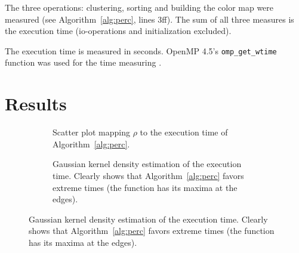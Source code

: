\documentclass[twoside,11pt]{article}
\begin{document}
The three operations: clustering, sorting and building the
color map were measured (see Algorithm~\ref{alg:perc},
lines 3ff).
The sum of all three measures is the execution time
(io-operations and initialization excluded).

The execution time is measured in seconds.
OpenMP 4.5's \texttt{omp\_get\_wtime} function was used
for the time measuring \citep[see][Chapter 3.4.1]{openmp}.


\section{Results} %

\begin{figure}[htbp]
\begin{center}
\noindent
\begin{subfigure}[t]{0.49\textwidth}
\caption{Scatter plot mapping $\rho$ to the execution time
  of Algorithm~\ref{alg:perc}.}
\end{subfigure}
\begin{subfigure}[t]{0.49\textwidth}
\caption{Gaussian kernel density estimation of the
  execution time. Clearly shows that
  Algorithm~\ref{alg:perc} favors extreme
  times (the function has its maxima at the edges). }
\end{subfigure}


\end{center}
\end{figure}
\end{document}

